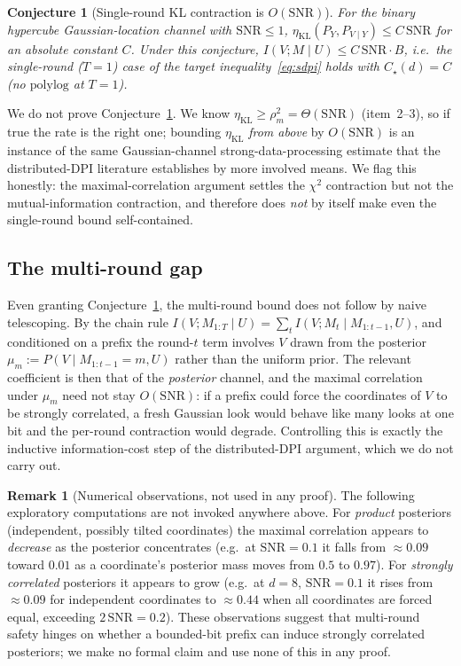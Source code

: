 \documentclass[11pt]{article}
\newtheorem{conjecture}{Conjecture}
\theoremstyle{definition}
\newtheorem{remark}{Remark}
\begin{document}
\begin{conjecture}[Single-round KL contraction is $O(\mathrm{SNR})$]
\label{conj:singleround}
For the binary hypercube Gaussian-location channel with $\mathrm{SNR}\le1$,
$\eta_{\mathrm{KL}}(P_Y,P_{V\mid Y})\le C\,\mathrm{SNR}$ for an absolute constant $C$. Under this conjecture,
$I(V;M\mid U)\le C\,\mathrm{SNR}\cdot B$, i.e.\ the single-round ($T=1$) case of
the target inequality~\eqref{eq:sdpi} holds with $C_\star(d)=C$ (no $\mathrm{polylog}$ at $T=1$).
\end{conjecture}

\noindent We do not prove Conjecture~\ref{conj:singleround}. We know $\eta_{\mathrm{KL}}\ge\rho_m^2=\Theta(\mathrm{SNR})$
(item~2--3), so if true the rate is the right one; bounding $\eta_{\mathrm{KL}}$ \emph{from above} by
$O(\mathrm{SNR})$ is an instance of the same Gaussian-channel strong-data-processing estimate that the
distributed-DPI literature establishes by more involved means. We flag this honestly: the
maximal-correlation argument settles the $\chi^2$ contraction but not the mutual-information contraction,
and therefore does \emph{not} by itself make even the single-round bound self-contained.

\subsection{The multi-round gap}\label{app:d:5}

Even granting Conjecture~\ref{conj:singleround}, the multi-round bound does not follow by naive
telescoping. By the chain rule $I(V;M_{1:T}\mid U)=\sum_t I(V;M_t\mid M_{1:t-1},U)$, and conditioned on a
prefix the round-$t$ term involves $V$ drawn from the posterior $\mu_m:=P(V\mid M_{1:t-1}=m,U)$ rather
than the uniform prior. The relevant coefficient is then that of the \emph{posterior} channel, and the
maximal correlation under $\mu_m$ need not stay $O(\mathrm{SNR})$: if a prefix could force the coordinates
of $V$ to be strongly correlated, a fresh Gaussian look would behave like many looks at one bit and the
per-round contraction would degrade. Controlling this is exactly the inductive information-cost step of
the distributed-DPI argument, which we do not carry out.

\begin{remark}[Numerical observations, not used in any proof]
\label{rem:numerics}
The following exploratory computations are not invoked anywhere above. For \emph{product} posteriors
(independent, possibly tilted coordinates) the maximal correlation appears to \emph{decrease} as the
posterior concentrates (e.g.\ at $\mathrm{SNR}=0.1$ it falls from $\approx0.09$ toward $0.01$ as a
coordinate's posterior mass moves from $0.5$ to $0.97$). For \emph{strongly correlated} posteriors it
appears to grow (e.g.\ at $d=8$, $\mathrm{SNR}=0.1$ it rises from $\approx0.09$ for independent
coordinates to $\approx0.44$ when all coordinates are forced equal, exceeding $2\,\mathrm{SNR}=0.2$).
These observations suggest that multi-round safety hinges on whether a bounded-bit prefix can induce
strongly correlated posteriors; we make no formal claim and use none of this in any proof.
\end{remark}
\end{document}
